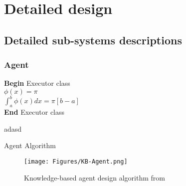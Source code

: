 \chapter{Detailed design} 
\label{Detailed_design}









\section{Detailed sub-systems descriptions}


\subsection{Agent}

\begin{algorithm}[H]
\SetAlgoLined
{}
	\Indp
	\textbf{Begin} Executor class \\
	$\phi(x)=\pi$\\
	$\int_{a}^{b} \phi(x) dx=\pi[b-a]$\\
	\textbf{End} Executor class
  
  \Indm adasd 
 \caption{Agent Algorithm}
\end{algorithm}


\begin{figure}[H]
    \centering
    \texttt{[image: Figures/KB-Agent.png]}
    \caption{Knowledge-based agent design algorithm from \cite{russell2016artificial}}
    \label{fig:sysdiag}
\end{figure}



